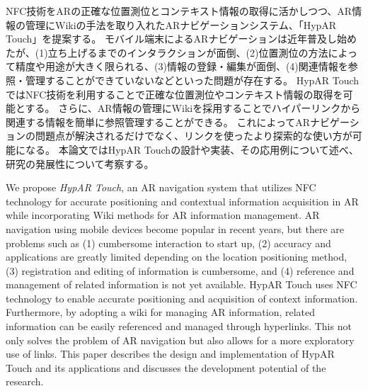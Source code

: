 


\begin{jabstract}
NFC技術をARの正確な位置測位とコンテキスト情報の取得に活かしつつ、AR情報の管理にWikiの手法を取り入れたARナビゲーションシステム、「HypAR Touch」を提案する。
モバイル端末によるARナビゲーションは近年普及し始めたが、(1)立ち上げるまでのインタラクションが面倒、(2)位置測位の方法によって精度や用途が大きく限られる、(3)情報の登録・編集が面倒、(4)関連情報を参照・管理することができていないなどといった問題が存在する。
HypAR TouchではNFC技術を利用することで正確な位置測位やコンテキスト情報の取得を可能とする。
さらに、AR情報の管理にWikiを採用することでハイパーリンクから関連する情報を簡単に参照管理することができる。
これによってARナビゲーションの問題点が解決されるだけでなく、リンクを使ったより探索的な使い方が可能になる。
本論文ではHypAR Touchの設計や実装、その応用例について述べ、研究の発展性について考察する。
\end{jabstract}



\begin{eabstract}
We propose \textit{HypAR Touch}, an AR navigation system that utilizes NFC technology for accurate positioning and contextual information acquisition in AR while incorporating Wiki methods for AR information management. 
AR navigation using mobile devices become popular in recent years, but there are problems such as (1) cumbersome interaction to start up, (2) accuracy and applications are greatly limited depending on the location positioning method, (3) registration and editing of information is cumbersome, and (4) reference and management of related information is not yet available. 
HypAR Touch uses NFC technology to enable accurate positioning and acquisition of context information. 
Furthermore, by adopting a wiki for managing AR information, related information can be easily referenced and managed through hyperlinks. 
This not only solves the problem of AR navigation but also allows for a more exploratory use of links.
This paper describes the design and implementation of HypAR Touch and its applications and discusses the development potential of the research.
\end{eabstract}
